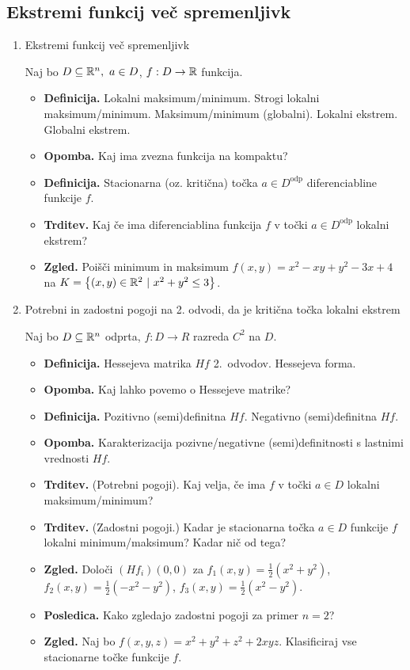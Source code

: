 \subsection{Ekstremi funkcij več spremenljivk}
\begin{enumerate}
    \item Ekstremi funkcij več spremenljivk
    
    Naj bo $D \subseteq \mathbb{R}^n, \ a \in D$, $f: D \to \mathbb{R}$ funkcija.
    
    \begin{itemize}
        \item \textbf{Definicija.} Lokalni maksimum/minimum. Strogi lokalni maksimum/minimum. Maksimum/minimum (globalni). Lokalni ekstrem. Globalni ekstrem.
        \item \textbf{Opomba.} Kaj ima zvezna funkcija na kompaktu?
        \item \textbf{Definicija.} Stacionarna (oz. kritična) točka $a \in D^\text{odp}$ diferenciabline funkcije $f$.
        \item \textbf{Trditev.} Kaj če ima diferenciablina funkcija $f$ v točki $a \in D^\text{odp}$ lokalni ekstrem?
        \item \textbf{Zgled.} Poišči minimum in maksimum $f(x,y) = x^2 - xy + y^2 -3x +4$ na $K = \left\{(x, y) \in \mathbb{R}^2 \ | \ x^2+y^2 \leq 3\right\}$.
    \end{itemize}    

    \item Potrebni in zadostni pogoji na 2. odvodi, da je kritična točka lokalni ekstrem
    
    Naj bo $D \subseteq \mathbb{R}^n$ odprta, $f: D \to R$ razreda $C^2$ na $D$.
    \begin{itemize}
        \item \textbf{Definicija.} Hessejeva matrika $Hf$ 2.\ odvodov. Hessejeva forma.
        \item \textbf{Opomba.} Kaj lahko povemo o Hessejeve matrike?
        \item \textbf{Definicija.} Pozitivno (semi)definitna $Hf$. Negativno (semi)definitna $Hf$.
        \item \textbf{Opomba.} Karakterizacija pozivne/negativne (semi)definitnosti s lastnimi vrednosti $Hf$.
        \item \textbf{Trditev.} (Potrebni pogoji). Kaj velja, če ima $f$ v točki $a \in D$ lokalni maksimum/minimum?
        \item \textbf{Trditev.} (Zadostni pogoji.) Kadar je stacionarna točka $a \in D$ funkcije $f$ lokalni minimum/maksimum? Kadar nič od tega?
        \item \textbf{Zgled.} Določi $(Hf_i)(0,0)$ za $f_1(x,y) = \frac{1}{2}(x^2+y^2)$, $f_2(x,y) = \frac{1}{2}(-x^2-y^2)$, $f_3(x,y) = \frac{1}{2}(x^2-y^2)$.
        \item \textbf{Posledica.} Kako zgledajo zadostni pogoji za primer $n = 2$?
        \item \textbf{Zgled.} Naj bo $f(x,y,z) = x^2+y^2+z^2 + 2xyz$. Klasificiraj vse stacionarne točke funkcije $f$.
    \end{itemize}


\end{enumerate}
